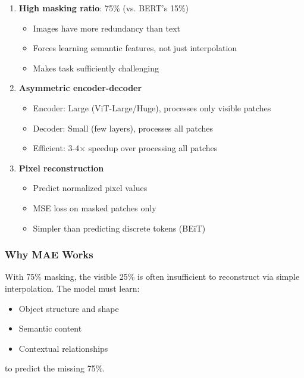 \begin{enumerate}
    \item \textbf{High masking ratio}: 75\% (vs. BERT's 15\%)
    \begin{itemize}
        \item Images have more redundancy than text
        \item Forces learning semantic features, not just interpolation
        \item Makes task sufficiently challenging
    \end{itemize}
    
    \item \textbf{Asymmetric encoder-decoder}
    \begin{itemize}
        \item Encoder: Large (ViT-Large/Huge), processes only visible patches
        \item Decoder: Small (few layers), processes all patches
        \item Efficient: 3-4× speedup over processing all patches
    \end{itemize}
    
    \item \textbf{Pixel reconstruction}
    \begin{itemize}
        \item Predict normalized pixel values
        \item MSE loss on masked patches only
        \item Simpler than predicting discrete tokens (BEiT)
    \end{itemize}
\end{enumerate}

\subsubsection{Why MAE Works}

\begin{keyinsight}
With 75\% masking, the visible 25\% is often insufficient to reconstruct via simple interpolation. The model must learn:
\begin{itemize}
    \item Object structure and shape
    \item Semantic content
    \item Contextual relationships
\end{itemize}
to predict the missing 75\%.
\end{keyinsight}

